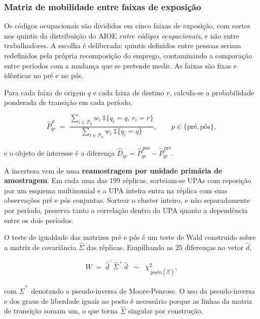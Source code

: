 \subsubsection{Matriz de mobilidade entre faixas de exposição}

Os códigos ocupacionais são divididos em cinco faixas de exposição, com cortes
nos quintis da distribuição do AIOE \emph{entre códigos ocupacionais}, e não
entre trabalhadores. A escolha é deliberada: quintis definidos entre pessoas
seriam redefinidos pela própria recomposição do emprego, contaminando a
comparação entre períodos com a mudança que se pretende medir. As faixas são
fixas e idênticas no pré e no pós.

Para cada faixa de origem $q$ e cada faixa de destino $r$, calcula-se a
probabilidade ponderada de transição em cada período,

\begin{equation}
  \widehat{P}^{\,p}_{qr} \;=\;
  \frac{\displaystyle\sum_{i \in \mathcal{P}_p} w_i \, \mathbb{1}\{q_i = q, \, r_i = r\}}
       {\displaystyle\sum_{i \in \mathcal{P}_p} w_i \, \mathbb{1}\{q_i = q\}},
  \qquad p \in \{\text{pré}, \text{pós}\},
  \label{eq:matriz}
\end{equation}

e o objeto de interesse é a diferença $\widehat{D}_{qr} = \widehat{P}^{\,
\text{pós}}_{qr} - \widehat{P}^{\,\text{pré}}_{qr}$.

A incerteza vem de uma \textbf{reamostragem por unidade primária de amostragem}.
Em cada uma das 199 réplicas, sorteiam-se UPAs com reposição por um esquema
multinomial e a UPA inteira entra na réplica com suas observações pré e pós
conjuntas. Sortear o cluster inteiro, e não separadamente por período, preserva
tanto a correlação dentro da UPA quanto a dependência entre os dois períodos.

O teste de igualdade das matrizes pré e pós é um teste de Wald construído sobre
a matriz de covariância $\widehat{\Sigma}$ das réplicas. Empilhando as $25$
diferenças no vetor $\widehat{d}$,

\begin{equation}
  W \;=\; \widehat{d}^{\,\prime} \, \widehat{\Sigma}^{+} \, \widehat{d}
  \;\;\sim\;\; \chi^2_{\,\mathrm{posto}(\widehat{\Sigma})},
  \label{eq:wald}
\end{equation}

com $\widehat{\Sigma}^{+}$ denotando a pseudo-inversa de Moore-Penrose. O uso da
pseudo-inversa e dos graus de liberdade iguais ao posto é necessário porque as
linhas da matriz de transição somam um, o que torna $\widehat{\Sigma}$
singular por construção.

